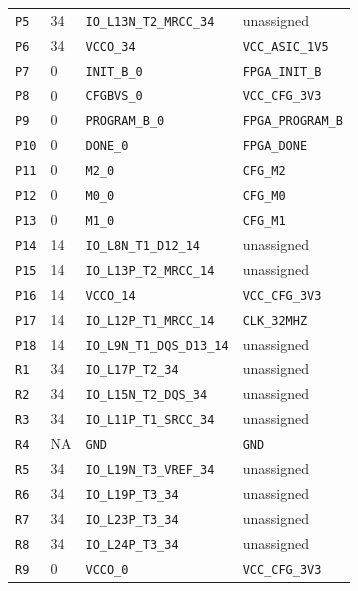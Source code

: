 \documentclass[11pt,a4paper]{article}
\begin{document}
\begin{longtable}{@{}P{13mm}P{13mm}P{78mm}P{62mm}@{}}
\nolinkurl{P5} & 34 & \nolinkurl{IO_L13N_T2_MRCC_34} & \textcolor{muted}{unassigned} \\
\nolinkurl{P6} & 34 & \nolinkurl{VCCO_34} & \nolinkurl{VCC_ASIC_1V5} \\
\nolinkurl{P7} & 0 & \nolinkurl{INIT_B_0} & \nolinkurl{FPGA_INIT_B} \\
\nolinkurl{P8} & 0 & \nolinkurl{CFGBVS_0} & \nolinkurl{VCC_CFG_3V3} \\
\nolinkurl{P9} & 0 & \nolinkurl{PROGRAM_B_0} & \nolinkurl{FPGA_PROGRAM_B} \\
\nolinkurl{P10} & 0 & \nolinkurl{DONE_0} & \nolinkurl{FPGA_DONE} \\
\nolinkurl{P11} & 0 & \nolinkurl{M2_0} & \nolinkurl{CFG_M2} \\
\nolinkurl{P12} & 0 & \nolinkurl{M0_0} & \nolinkurl{CFG_M0} \\
\nolinkurl{P13} & 0 & \nolinkurl{M1_0} & \nolinkurl{CFG_M1} \\
\nolinkurl{P14} & 14 & \nolinkurl{IO_L8N_T1_D12_14} & \textcolor{muted}{unassigned} \\
\nolinkurl{P15} & 14 & \nolinkurl{IO_L13P_T2_MRCC_14} & \textcolor{muted}{unassigned} \\
\nolinkurl{P16} & 14 & \nolinkurl{VCCO_14} & \nolinkurl{VCC_CFG_3V3} \\
\nolinkurl{P17} & 14 & \nolinkurl{IO_L12P_T1_MRCC_14} & \nolinkurl{CLK_32MHZ} \\
\nolinkurl{P18} & 14 & \nolinkurl{IO_L9N_T1_DQS_D13_14} & \textcolor{muted}{unassigned} \\
\nolinkurl{R1} & 34 & \nolinkurl{IO_L17P_T2_34} & \textcolor{muted}{unassigned} \\
\nolinkurl{R2} & 34 & \nolinkurl{IO_L15N_T2_DQS_34} & \textcolor{muted}{unassigned} \\
\nolinkurl{R3} & 34 & \nolinkurl{IO_L11P_T1_SRCC_34} & \textcolor{muted}{unassigned} \\
\nolinkurl{R4} & NA & \nolinkurl{GND} & \nolinkurl{GND} \\
\nolinkurl{R5} & 34 & \nolinkurl{IO_L19N_T3_VREF_34} & \textcolor{muted}{unassigned} \\
\nolinkurl{R6} & 34 & \nolinkurl{IO_L19P_T3_34} & \textcolor{muted}{unassigned} \\
\nolinkurl{R7} & 34 & \nolinkurl{IO_L23P_T3_34} & \textcolor{muted}{unassigned} \\
\nolinkurl{R8} & 34 & \nolinkurl{IO_L24P_T3_34} & \textcolor{muted}{unassigned} \\
\nolinkurl{R9} & 0 & \nolinkurl{VCCO_0} & \nolinkurl{VCC_CFG_3V3} \\

\end{longtable}
\end{document}
